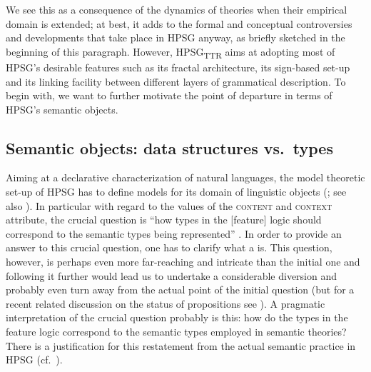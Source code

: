 \documentclass[output=paper
 	        ,biblatex
                ,babelshorthands
                ,newtxmath
                ,draftmode
                ,colorlinks, citecolor=brown
]{langscibook}
\begin{document}
%
We see this as a consequence of the dynamics of theories when their empirical domain is extended; at best, it adds to the formal and conceptual controversies and developments that take place in HPSG anyway, as briefly sketched in the beginning of this paragraph. 
%
However, HPSG\textsubscript{TTR} aims at adopting most of HPSG's desirable features such as its fractal architecture, its sign-based set-up and its linking facility between different layers of grammatical description. 
%
To begin with, we want to further motivate the point of departure in terms of HPSG's semantic objects.


\subsection{Semantic objects: data structures vs.\ types}
\label{sec:semantic-objects}

Aiming at a declarative characterization of natural languages, the model theoretic set-up of HPSG has to define models for its domain of linguistic objects  (\citealt[Section~3]{Levine:Meurers:2006}; see also ).
%
In particular with regard to the values of the \textsc{content} and \textsc{context} attribute, the crucial question is \enquote{how types in the [feature] logic should correspond to the semantic types being represented}  \citep[]{Penn:2000}.
%
In order to provide an answer to this crucial question, one has to clarify what a  is. 
%
This question, however, is perhaps even more far-reaching and intricate than the initial one and following it further would lead us to undertake a considerable diversion and probably even turn away from the actual point of the initial question (but for a recent related discussion on the status of propositions see \citealt{King:Soames:Speaks:2014}).
%
A pragmatic interpretation of the crucial question probably is this: how do the types in the feature logic correspond to the semantic types employed in semantic theories?
%
There is a justification for this restatement from the actual semantic practice in HPSG (cf.\ ).
\end{document}
